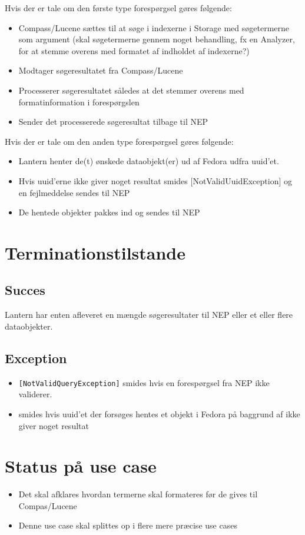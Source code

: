 \documentclass{article}
\begin{document}
Hvis der er tale om den første type forespørgsel gøres følgende:
\begin{itemize}
\item Compass/Lucene sættes til at søge i indexerne i Storage med søgetermerne
  som argument (skal søgetermerne gennem noget behandling, fx en
  Analyzer, for at stemme overens med formatet af indholdet af indexerne?) 
\item Modtager søgeresultatet fra Compass/Lucene
\item Processerer søgeresultatet således at det stemmer overens med
  formatinformation i forespørgslen
\item Sender det processerede søgeresultat tilbage til NEP
\end{itemize}

Hvis der er tale om den anden type forespørgsel gøres følgende:
\begin{itemize}
\item Lantern henter de(t) ønskede dataobjekt(er) ud af Fedora
  udfra uuid'et.
\item Hvis uuid'erne ikke giver noget resultat smides
  [NotValidUuidException] og en fejlmeddelse sendes til NEP
\item De hentede objekter pakkes ind og sendes til NEP
\end{itemize}

\section{Terminationstilstande}

\subsection{Succes}
Lantern har enten afleveret en mængde søgeresultater til NEP
eller et eller flere dataobjekter.

\subsection{Exception}
\begin{itemize}
\item \texttt{[NotValidQueryException]} smides hvis en forespørgsel
  fra NEP ikke validerer.
\item \textt{[NotValidUuidException]} smides hvis uuid'et der forsøges
  hentes et objekt i Fedora på baggrund af ikke giver noget resultat
\end{itemize}
\section{Status på use case}

\begin{itemize}
\item Det skal afklares hvordan termerne skal formateres før de gives
  til Compas/Lucene 
\item Denne use case skal splittes op i flere mere præcise use cases
\end{itemize}
\end{document}
